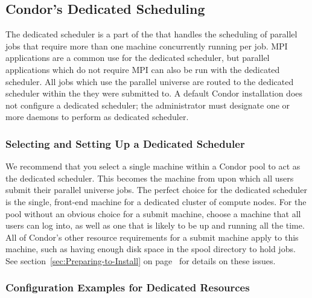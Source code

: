 \subsection{\label{sec:Config-Dedicated-Jobs}
Condor's Dedicated Scheduling} 

The dedicated scheduler is a part of the  that handles 
the scheduling of parallel jobs that require more than one machine
concurrently running per job.  
MPI applications are a common use for the dedicated scheduler, 
but parallel applications which do not require MPI can also be run 
with the dedicated scheduler.
All jobs which use the parallel universe are routed to the dedicated scheduler
within the  they were submitted to.  
A default Condor installation
does not configure a dedicated scheduler; 
the administrator must designate one or more  daemons
to perform as dedicated scheduler.

\subsubsection{\label{sec:Setup-Dedicated-Scheduler}
Selecting and Setting Up a Dedicated Scheduler}

We recommend that you select a single machine within a 
Condor pool to act as the dedicated scheduler.
This becomes the machine from upon which all users submit their 
parallel universe jobs.
The perfect choice for the dedicated scheduler 
is the single, front-end machine for
a dedicated cluster of compute nodes.
For the pool without an obvious choice for a submit machine,
choose a machine that all users can log into, as well as one
that is likely to be up and running all the time.
All of Condor's other resource requirements for a submit machine apply to
this machine, such as having enough disk space in the spool
directory to hold jobs. See section~\ref{sec:Preparing-to-Install} on
page~\pageref{sec:Preparing-to-Install} for details on these issues. 

\subsubsection{\label{sec:Configure-Dedicated-Resource}
Configuration Examples for Dedicated Resources} 


